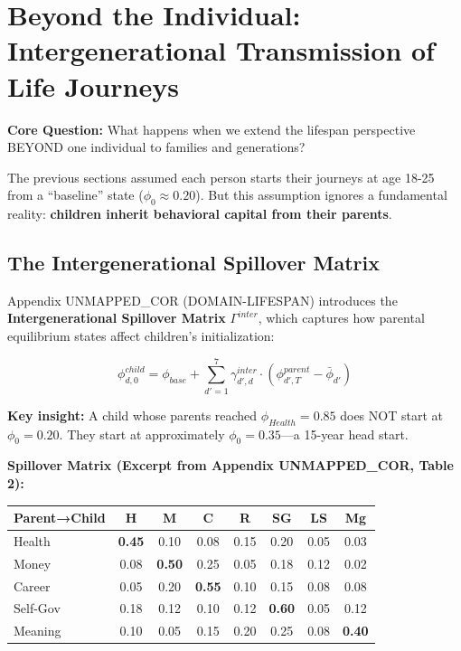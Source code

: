 {{{\section{Beyond the Individual: Intergenerational Transmission of Life Journeys}
\label{sec:intergenerational}

\textbf{Core Question:} What happens when we extend the lifespan perspective BEYOND one individual to families and generations?

The previous sections assumed each person starts their journeys at age 18-25 from a ``baseline'' state ($\phi_0 \approx 0.20$). But this assumption ignores a fundamental reality: \textbf{children inherit behavioral capital from their parents}.

\subsection{The Intergenerational Spillover Matrix}

Appendix UNMAPPED_COR (DOMAIN-LIFESPAN) introduces the \textbf{Intergenerational Spillover Matrix} $\Gamma^{inter}$, which captures how parental equilibrium states affect children's initialization:

\begin{equation}
\phi^{child}_{d,0} = \phi_{base} + \sum_{d'=1}^{7} \gamma^{inter}_{d',d} \cdot \left(\phi^{parent}_{d',T} - \bar{\phi}_{d'}\right)
\end{equation}

\textbf{Key insight:} A child whose parents reached $\phi_{Health} = 0.85$ does NOT start at $\phi_0 = 0.20$. They start at approximately $\phi_0 = 0.35$---a 15-year head start.

\textbf{Spillover Matrix (Excerpt from Appendix UNMAPPED_COR, Table 2):}

\begin{center}
\small
\begin{tabular}{@{}l|ccccccc@{}}
\toprule
\textbf{Parent→Child} & \textbf{H} & \textbf{M} & \textbf{C} & \textbf{R} & \textbf{SG} & \textbf{LS} & \textbf{Mg} \\
\midrule
Health & \textbf{0.45} & 0.10 & 0.08 & 0.15 & 0.20 & 0.05 & 0.03 \\
Money & 0.08 & \textbf{0.50} & 0.25 & 0.05 & 0.18 & 0.12 & 0.02 \\
Career & 0.05 & 0.20 & \textbf{0.55} & 0.10 & 0.15 & 0.08 & 0.08 \\
Self-Gov & 0.18 & 0.12 & 0.10 & 0.12 & \textbf{0.60} & 0.05 & 0.12 \\
Meaning & 0.10 & 0.05 & 0.15 & 0.20 & 0.25 & 0.08 & \textbf{0.40} \\
\bottomrule
\end{tabular}
\end{center}

}}}
